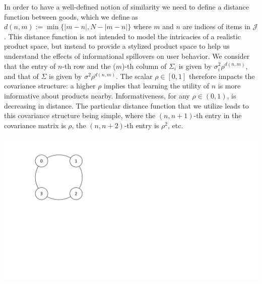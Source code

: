 \documentclass[sigconf, anonymous, review]{acmart}
\begin{document}
In order to have a well-defined notion of similarity we need to define a distance function between goods, which we define as $d(n,m):=\min\{ \lvert m - n \rvert ,N - \lvert m - n \rvert \}$ where $m$ and $n$ are indices of items in $\mathcal{J}$. This distance function is not intended to model the intricacies of a realistic product space, but instead to provide a stylized product space to help us understand the effects of informational spillovers on user behavior. We consider that the entry of $n$-th row and the ($m$)-th column of $\Sigma_i$ is given by $\sigma_i^2 \rho^{d(n,m)}$, and that of $\Sigma$ is given by $\sigma^2 \rho^{d(n,m)}$. The scalar $\rho \in [0,1]$ therefore impacts the covariance structure: a higher $\rho$ implies that learning the utility of $n$ is more informative about products nearby. Informativeness, for any $\rho \in (0,1)$, is decreasing in distance. The particular distance function that we utilize leads to this covariance structure being simple, where the $(n,n+1)$-th entry in the covariance matrix is $\rho$, the $(n,n+2)$-th entry is $\rho^2$, etc.
\par
\begin{center}
\includegraphics[width=.4\linewidth]{Example-Bubbles.pdf}
\label{fig:illustrative_example}
\end{center}
\end{document}
